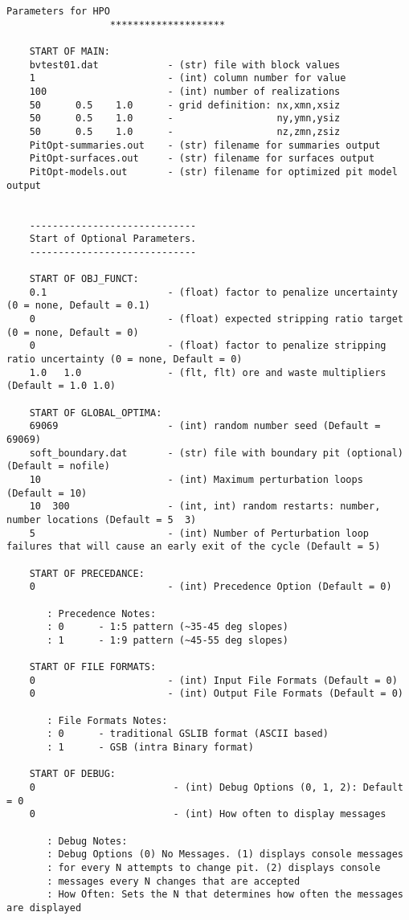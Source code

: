     \begin{framed}
    \begin{lstlisting}[style=ccgParameterfile]
                   Parameters for HPO
                  ********************

    START OF MAIN:
    bvtest01.dat            - (str) file with block values
    1                       - (int) column number for value
    100                     - (int) number of realizations
    50      0.5    1.0      - grid definition: nx,xmn,xsiz
    50      0.5    1.0      -                  ny,ymn,ysiz
    50      0.5    1.0      -                  nz,zmn,zsiz
    PitOpt-summaries.out    - (str) filename for summaries output
    PitOpt-surfaces.out     - (str) filename for surfaces output
    PitOpt-models.out       - (str) filename for optimized pit model output


    -----------------------------
    Start of Optional Parameters.
    -----------------------------

    START OF OBJ_FUNCT:
    0.1                     - (float) factor to penalize uncertainty (0 = none, Default = 0.1)
    0                       - (float) expected stripping ratio target (0 = none, Default = 0)
    0                       - (float) factor to penalize stripping ratio uncertainty (0 = none, Default = 0)
    1.0   1.0               - (flt, flt) ore and waste multipliers (Default = 1.0 1.0)

    START OF GLOBAL_OPTIMA:
    69069                   - (int) random number seed (Default = 69069)
    soft_boundary.dat       - (str) file with boundary pit (optional) (Default = nofile)
    10                      - (int) Maximum perturbation loops (Default = 10)
    10  300                 - (int, int) random restarts: number, number locations (Default = 5  3)
    5                       - (int) Number of Perturbation loop failures that will cause an early exit of the cycle (Default = 5)

    START OF PRECEDANCE:
    0                       - (int) Precedence Option (Default = 0)

       : Precedence Notes:
       : 0      - 1:5 pattern (~35-45 deg slopes)
       : 1      - 1:9 pattern (~45-55 deg slopes)

    START OF FILE FORMATS:
    0                       - (int) Input File Formats (Default = 0)
    0                       - (int) Output File Formats (Default = 0)

       : File Formats Notes:
       : 0      - traditional GSLIB format (ASCII based)
       : 1      - GSB (intra Binary format)

    START OF DEBUG:
    0                        - (int) Debug Options (0, 1, 2): Default = 0
    0                        - (int) How often to display messages

       : Debug Notes:
       : Debug Options (0) No Messages. (1) displays console messages
       : for every N attempts to change pit. (2) displays console
       : messages every N changes that are accepted
       : How Often: Sets the N that determines how often the messages are displayed
    \end{lstlisting}
    \end{framed}


